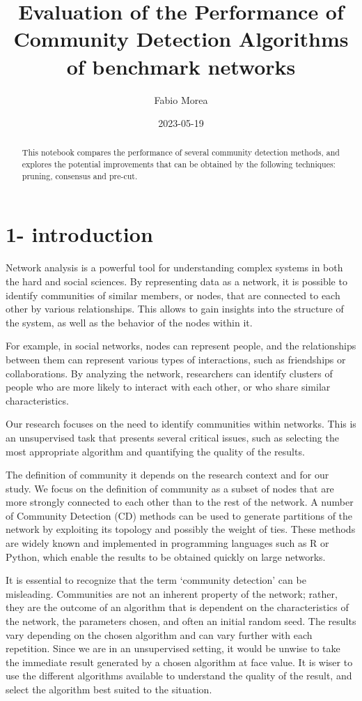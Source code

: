 \documentclass[
]{article}
\title{Evaluation of the Performance of Community Detection Algorithms
of benchmark networks}
\author{Fabio Morea}
\date{2023-05-19}
\begin{document}
\maketitle
\begin{abstract}
This notebook compares the performance of several community detection
methods, and explores the potential improvements that can be obtained by
the following techniques: pruning, consensus and pre-cut.
\end{abstract}

\hypertarget{introduction}{%
\section{1- introduction}\label{introduction}}

Network analysis is a powerful tool for understanding complex systems in
both the hard and social sciences. By representing data as a network, it
is possible to identify communities of similar members, or nodes, that
are connected to each other by various relationships. This allows to
gain insights into the structure of the system, as well as the behavior
of the nodes within it.

For example, in social networks, nodes can represent people, and the
relationships between them can represent various types of interactions,
such as friendships or collaborations. By analyzing the network,
researchers can identify clusters of people who are more likely to
interact with each other, or who share similar characteristics.

Our research focuses on the need to identify communities within
networks. This is an unsupervised task that presents several critical
issues, such as selecting the most appropriate algorithm and quantifying
the quality of the results.

The definition of community it depends on the research context and for
our study. We focus on the definition of community as a subset of nodes
that are more strongly connected to each other than to the rest of the
network. A number of Community Detection (CD) methods can be used to
generate partitions of the network by exploiting its topology and
possibly the weight of ties. These methods are widely known and
implemented in programming languages such as R or Python, which enable
the results to be obtained quickly on large networks.

It is essential to recognize that the term `community detection' can be
misleading. Communities are not an inherent property of the network;
rather, they are the outcome of an algorithm that is dependent on the
characteristics of the network, the parameters chosen, and often an
initial random seed. The results vary depending on the chosen algorithm
and can vary further with each repetition. Since we are in an
unsupervised setting, it would be unwise to take the immediate result
generated by a chosen algorithm at face value. It is wiser to use the
different algorithms available to understand the quality of the result,
and select the algorithm best suited to the situation.
\end{document}
